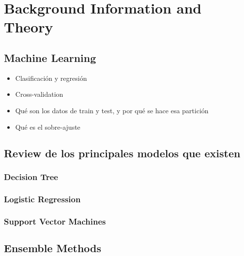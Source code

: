 
\chapter{Background Information and Theory} %

\label{Chapter2} %


\section{Machine Learning}
\begin{note}
  \begin{itemize}
    \item Clasificación y regresión
    \item Cross-validation
    \item Qué son los datos de train y test, y por qué se hace esa partición
    \item Qué es el sobre-ajuste
  \end{itemize}
\end{note}

\begin{note}
  \section{Review de los principales modelos que existen}
\end{note}
  \subsection{Decision Tree}
  \subsection{Logistic Regression}
  \subsection{Support Vector Machines}

\section{Ensemble Methods}
